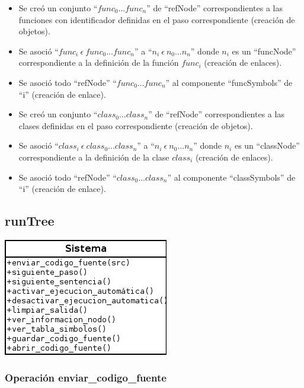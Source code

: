 \begin{description}
\begin {itemize}
         \item Se creó un conjunto ``$func_0...func_n$'' de ``refNode'' correspondientes a las funciones con identificador definidas en el paso correspondiente (creación de objetos).
         \item Se asoció ``$func_i\ \epsilon\ func_0...func_n$'' a  ``$n_i\ \epsilon\ n_0...n_n$'' donde $n_i$ es un ``funcNode'' correspondiente a la definición de la función $func_i$ (creación de enlaces).
         \item Se asoció todo ``refNode'' ``$func_0...func_n$'' al componente ``funcSymbols'' de ``i'' (creación de enlace). 
         \item Se creó un conjunto ``$class_0...class_n$'' de ``refNode'' correspondientes a las clases definidas en el paso correspondiente (creación de objetos).
         \item Se asoció ``$class_i\ \epsilon\ class_0...class_n$'' a  ``$n_i\ \epsilon\ n_0...n_n$'' donde $n_i$ es un ``classNode'' correspondiente a la definición de la clase $class_i$ (creación de enlaces).
         \item Se asoció todo ``refNode'' ``$class_0...class_n$'' al componente ``classSymbols'' de ``i'' (creación de enlace). 
      \end{itemize}
	\end{description}

\subsection{runTree}
\begin{center}
\includegraphics[scale=0.7]{operaciones_sistema_runtree.png} \\
\end{center}
\subsubsection{Operación enviar\_codigo\_fuente}

